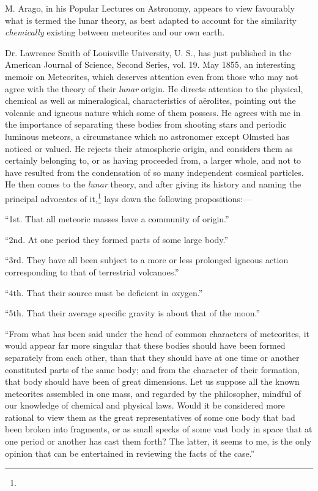 \documentclass[a4paper, 12pt, oneside]{article}
\begin{document}
M. Arago, in his Popular Lectures on Astronomy, appears to view favourably what is termed the lunar theory, as best adapted to account for the similarity \emph{chemically} existing between meteorites and our own earth.

Dr. Lawrence Smith of Louisville University, U. S., has just published in the American Journal of Science, Second Series, vol. 19. May 1855, an interesting memoir on Meteorites, which deserves attention even from those who may not agree with the theory of their \emph{lunar} origin. He directs attention to the physical, chemical as well as mineralogical, characteristics of aërolites, pointing out the volcanic and igneous nature which some of them possess. He agrees with me in the importance of separating these bodies from shooting stars and periodic luminous meteors, a circumstance which no astronomer except Olmsted has noticed or valued. He rejects their atmospheric origin, and considers them as certainly belonging to, or as having proceeded from, a larger whole, and not to have resulted from the condensation of so many independent cosmical particles. He then comes to the \emph{lunar} theory, and after giving its history and naming the principal advocates of it,\footnote{} lays down the following propositions:---

``1st. That all meteoric masses have a community of origin.''

``2nd. At one period they formed parts of some large body.''

``3rd. They have all been subject to a more or less prolonged igneous action corresponding to that of terrestrial volcanoes.''

``4th. That their source must be deficient in oxygen.''

``5th. That their average specific gravity is about that of the moon.''

``From what has been said under the head of common characters of meteorites, it would appear far more singular that these bodies should have been formed separately from each other, than that they should have at one time or another constituted parts of the same body; and from the character of their formation, that body should have been of great dimensions. Let us suppose all the known meteorites assembled in one mass, and regarded by the philosopher, mindful of our knowledge of chemical and physical laws. Would it be considered more rational to view them as the great representatives of some one body that bad been broken into fragments, or as small specks of some vast body in space that at one period or another has cast them forth? The latter, it seems to me, is the only opinion that can be entertained in reviewing the facts of the case.''
\end{document}
